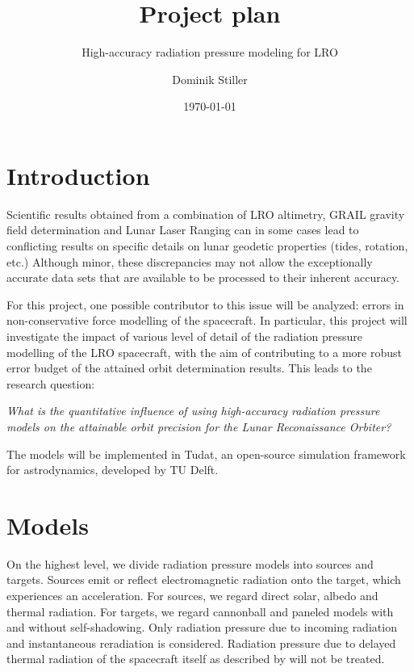 \documentclass[parskip=full,DIV=15]{scrartcl}
\title{Project plan}
\subtitle{High-accuracy radiation pressure modeling for LRO}
\author{Dominik Stiller}
\date{\today}
\begin{document}
\maketitle


\printnomenclature







\section{Introduction}
Scientific results obtained from a combination of LRO altimetry, GRAIL gravity field determination and Lunar Laser Ranging can in some cases lead to conflicting results on specific details on lunar geodetic properties (tides, rotation, etc.) Although minor, these discrepancies may not allow the exceptionally accurate data sets that are available to be processed to their inherent accuracy.

For this project, one possible contributor to this issue will be analyzed: errors in non-conservative force modelling of the spacecraft. In particular, this project will investigate the impact of various level of detail of the radiation pressure modelling of the LRO spacecraft, with the aim of contributing to a more robust error budget of the attained orbit determination results. This leads to the research question:
\begin{displayquote}\textit{
   What is the quantitative influence of using high-accuracy radiation pressure models on the attainable orbit precision for the Lunar Reconaissance Orbiter?
}\end{displayquote}

The models will be implemented in Tudat, an open-source simulation framework for astrodynamics, developed by TU Delft.







\section{Models}\label{sec:models}
On the highest level, we divide radiation pressure models into sources and targets. Sources emit or reflect electromagnetic radiation onto the target, which experiences an acceleration. For sources, we regard direct solar, albedo and thermal radiation. For targets, we regard cannonball and paneled models with and without self-shadowing. Only radiation pressure due to incoming radiation and instantaneous reradiation is considered. Radiation pressure due to delayed thermal radiation of the spacecraft itself as described by \textcite{Wetterer2014} will not be treated.
\end{document}
